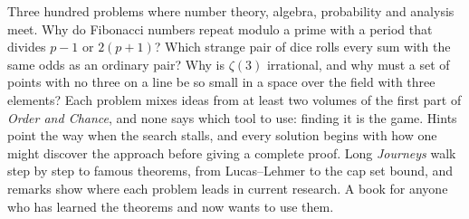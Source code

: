 Three hundred problems where number theory, algebra, probability and analysis meet. Why do Fibonacci numbers repeat
modulo a prime with a period that divides $p-1$ or $2(p+1)$? Which strange pair of dice rolls every sum with the same odds as
an ordinary pair? Why is $\zeta(3)$ irrational, and why must a set of points with no three on a line be so small in a space over
the field with three elements? Each problem mixes ideas from at least two volumes of the first part of \emph{Order and Chance}, and none says which
tool to use: finding it is the game. Hints point the way when the search stalls, and every solution begins with how one
might discover the approach before giving a complete proof. Long \emph{Journeys} walk step by step to famous theorems, from
Lucas--Lehmer to the cap set bound, and remarks show where each problem leads in current research. A book for anyone who has learned the
theorems and now wants to use them.
